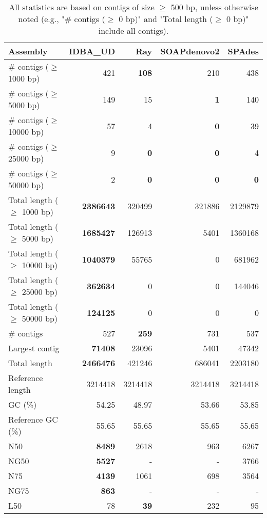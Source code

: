 \documentclass[12pt,a4paper]{article}
\begin{document}
\begin{table}[ht]
\begin{center}
\caption{All statistics are based on contigs of size $\geq$ 500 bp, unless otherwise noted (e.g., "\# contigs ($\geq$ 0 bp)" and "Total length ($\geq$ 0 bp)" include all contigs).}
\begin{tabular}{|l*{4}{|r}|}
\hline
Assembly & IDBA\_UD & Ray & SOAPdenovo2 & SPAdes \\ \hline
\# contigs ($\geq$ 1000 bp) & 421 & {\bf 108} & 210 & 438 \\ \hline
\# contigs ($\geq$ 5000 bp) & 149 & 15 & {\bf 1} & 140 \\ \hline
\# contigs ($\geq$ 10000 bp) & 57 & 4 & {\bf 0} & 39 \\ \hline
\# contigs ($\geq$ 25000 bp) & 9 & {\bf 0} & {\bf 0} & 4 \\ \hline
\# contigs ($\geq$ 50000 bp) & 2 & {\bf 0} & {\bf 0} & {\bf 0} \\ \hline
Total length ($\geq$ 1000 bp) & {\bf 2386643} & 320499 & 321886 & 2129879 \\ \hline
Total length ($\geq$ 5000 bp) & {\bf 1685427} & 126913 & 5401 & 1360168 \\ \hline
Total length ($\geq$ 10000 bp) & {\bf 1040379} & 55765 & 0 & 681962 \\ \hline
Total length ($\geq$ 25000 bp) & {\bf 362634} & 0 & 0 & 144046 \\ \hline
Total length ($\geq$ 50000 bp) & {\bf 124125} & 0 & 0 & 0 \\ \hline
\# contigs & 527 & {\bf 259} & 731 & 537 \\ \hline
Largest contig & {\bf 71408} & 23096 & 5401 & 47342 \\ \hline
Total length & {\bf 2466476} & 421246 & 686041 & 2203180 \\ \hline
Reference length & 3214418 & 3214418 & 3214418 & 3214418 \\ \hline
GC (\%) & 54.25 & 48.97 & 53.66 & 53.85 \\ \hline
Reference GC (\%) & 55.65 & 55.65 & 55.65 & 55.65 \\ \hline
N50 & {\bf 8489} & 2618 & 963 & 6267 \\ \hline
NG50 & {\bf 5527} & - & - & 3766 \\ \hline
N75 & {\bf 4139} & 1061 & 698 & 3564 \\ \hline
NG75 & {\bf 863} & - & - & - \\ \hline
L50 & 78 & {\bf 39} & 232 & 95 \\ \hline

\end{tabular}
\end{center}
\end{table}
\end{document}
